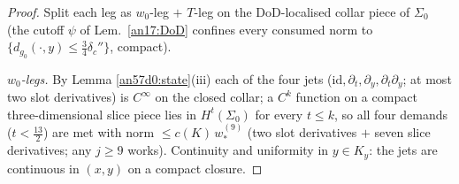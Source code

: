 \begin{proof}
Split each leg as $w_0$-leg $+$ $T$-leg on the DoD-localised collar piece of
$\Sigma_0$ (the cutoff $\psi$ of Lem.\ \ref{an17:DoD} confines every consumed norm
to $\{d_{g_0}(\cdot,y)\le\tfrac34\delta_c''\}$, compact).

\emph{$w_0$-legs.} By Lemma \ref{an57d0:state}(iii) each of the four jets
($\mathrm{id},\partial_t,\partial_y,\partial_t\partial_y$; at most two slot
derivatives) is $C^\infty$ on the closed collar; a $C^k$ function on a
compact three-dimensional slice piece lies in $H^t(\Sigma_0)$ for every
$t\le k$, so all four demands ($t<\tfrac{13}2$) are met with norm
$\le c(K)\,w_*^{(9)}$ (two slot derivatives $+$ seven slice derivatives;
any $j\ge9$ works). Continuity and uniformity in $y\in K_y$: the jets are
continuous in $(x,y)$ on a compact closure.


\end{proof}
